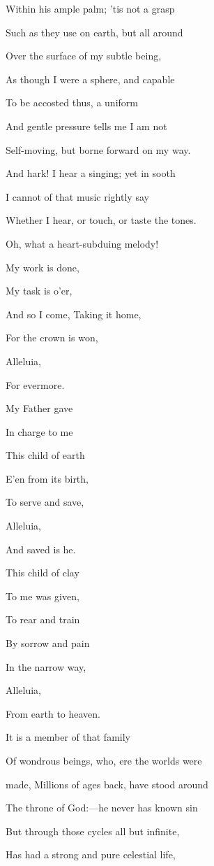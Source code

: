 Within his ample palm; 'tis not a grasp

Such as they use on earth, but all around

Over the surface of my subtle being,

As though I were a sphere, and capable

To be accosted thus, a uniform

And gentle pressure tells me I am not

Self-moving, but borne forward on my way.

And hark! I hear a singing; yet in sooth

I cannot of that music rightly say

Whether I hear, or touch, or taste the tones.

Oh, what a heart-subduing melody!


My work is done,

My task is o'er,

And so I come, Taking it home,

For the crown is won,

Alleluia,

For evermore.

My Father gave

In charge to me

This child of earth

E'en from its birth,

To serve and save,

Alleluia,

And saved is he.

This child of clay

To me was given,

To rear and train

By sorrow and pain

In the narrow way,

Alleluia,

From earth to heaven.


It is a member of that family

Of wondrous beings, who, ere the worlds were

made, Millions of ages back, have stood around

The throne of God:—he never has known sin

But through those cycles all but infinite,

Has had a strong and pure celestial life,

